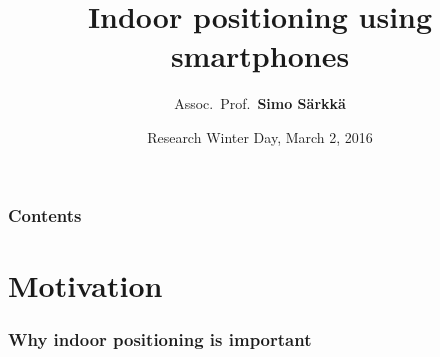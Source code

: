 \documentclass[xcolor=svgnames,english,handout]{beamer}
\title{Indoor positioning using smartphones}
\author[Simo S\"arkk\"a]{Assoc.~Prof.~{\bf Simo S\"arkk\"a}}
\institute[EEA Department]{\balert{EEA Department / ELEC@Aalto}} %
\date[March 2, 2016]{\alert{Research Winter Day, March 2, 2016}}
\begin{document}

\begin{frame}
  \titlepage
\end{frame}


\begin{frame}
  \frametitle{Contents}
  \tableofcontents[pausesections]
\end{frame}


\section{Motivation}

\begin{frame}
  \frametitle{Why indoor positioning is important}


  \begin{columns}
  \begin{column}{0.7\textwidth}
  \begin{itemize}[<+->]



\end{itemize}
\end{column}
\end{columns}
\end{frame}
\end{document}
